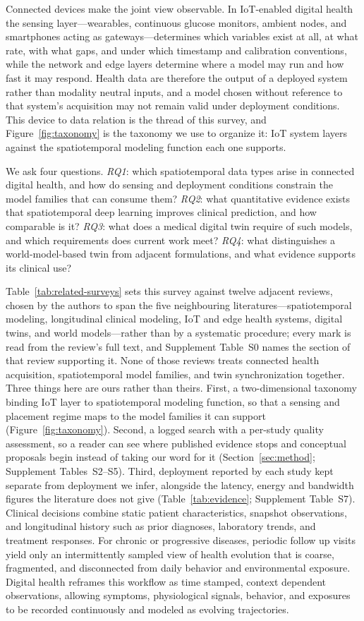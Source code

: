 \documentclass[journal]{IEEEtran}
\begin{document}
Connected devices make the joint view observable. In IoT-enabled digital health the sensing layer---wearables, continuous glucose monitors, ambient nodes, and smartphones acting as gateways---determines which variables exist at all, at what rate, with what gaps, and under which timestamp and calibration conventions, while the network and edge layers determine where a model may run and how fast it may respond. Health data are therefore the output of a deployed system rather than modality neutral inputs, and a model chosen without reference to that system's acquisition may not remain valid under deployment conditions. This device to data relation is the thread of this survey, and Figure~\ref{fig:taxonomy} is the taxonomy we use to organize it: IoT system layers against the spatiotemporal modeling function each one supports.

We ask four questions. \emph{RQ1}: which spatiotemporal data types arise in connected digital health, and how do sensing and deployment conditions constrain the model families that can consume them? \emph{RQ2}: what quantitative evidence exists that spatiotemporal deep learning improves clinical prediction, and how comparable is it? \emph{RQ3}: what does a medical digital twin require of such models, and which requirements does current work meet? \emph{RQ4}: what distinguishes a world-model-based twin from adjacent formulations, and what evidence supports its clinical use?

Table~\ref{tab:related-surveys} sets this survey against twelve adjacent reviews, chosen by the authors to span the five neighbouring literatures---spatiotemporal modeling, longitudinal clinical modeling, IoT and edge health systems, digital twins, and world models---rather than by a systematic procedure; every mark is read from the review's full text, and Supplement Table~S0 names the section of that review supporting it. None of those reviews treats connected health acquisition, spatiotemporal model families, and twin synchronization together. Three things here are ours rather than theirs. First, a two-dimensional taxonomy binding IoT layer to spatiotemporal modeling function, so that a sensing and placement regime maps to the model families it can support (Figure~\ref{fig:taxonomy}). Second, a logged search with a per-study quality assessment, so a reader can see where published evidence stops and conceptual proposals begin instead of taking our word for it (Section~\ref{sec:method}; Supplement Tables~S2--S5). Third, deployment reported by each study kept separate from deployment we infer, alongside the latency, energy and bandwidth figures the literature does not give (Table~\ref{tab:evidence}; Supplement Table~S7).
\else
Clinical decisions combine static patient characteristics, snapshot observations, and longitudinal history such as prior diagnoses, laboratory trends, and treatment responses. For chronic or progressive diseases, periodic follow up visits yield only an intermittently sampled view of health evolution that is coarse, fragmented, and disconnected from daily behavior and environmental exposure. Digital health reframes this workflow as time stamped, context dependent observations, allowing symptoms, physiological signals, behavior, and exposures to be recorded continuously and modeled as evolving trajectories.
\end{document}
